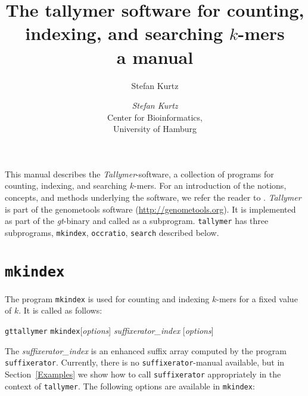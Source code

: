 \documentclass[12pt]{article}
\title{The tallymer software for counting, indexing, and searching $k$-mers\\
a manual}
\author{Stefan Kurtz}
\author{\begin{tabular}{c}
         \emph{Stefan Kurtz}\\
         Center for Bioinformatics,\\
         University of Hamburg
        \end{tabular}}
\newcommand{\Programname}[1]{\texttt{\small #1}}
\newcommand{\Tallymer}[0]{\Programname{tallymer}\xspace}
\newcommand{\TYmkindex}[0]{\Programname{mkindex}\xspace}
\newcommand{\TYsearch}[0]{\Programname{search}\xspace}
\newcommand{\TYoccratio}[0]{\Programname{occratio}\xspace}
\newcommand{\SFX}[0]{\Programname{suffixerator}\xspace}
\newcommand{\GT}[0]{\Programname{gt}\xspace}
\newcommand{\Typrogintro}[1]{
\par
\noindent\GT \Programname{tallymer} #1\xspace [\emph{options}] \Showoption{esa} \emph{suffixerator\_index} [\emph{options}]
\par
The \emph{suffixerator\_index} is an enhanced suffix array computed by the
program \SFX. Currently, there is no \SFX-manual available, but in 
Section~\ref{Examples} we show how to call \SFX appropriately in  the context of
\Tallymer. The following options are available in #1:}
\begin{document}
\maketitle
This manual describes the \textit{Tallymer}-software, a collection of programs
for counting, indexing, and searching $k$-mers. For an introduction of
the notions, concepts, and methods underlying the software, we refer
the reader to \cite{KUR:NER:STE:WAR:2008}. \textit{Tallymer} is part of
the genometools software (\url{http://genometools.org}). It is implemented
as part of the \textit{gt}-binary and called as a subprogram. \Tallymer
has three subprograms, \TYmkindex, \TYoccratio, \TYsearch described below.

\section{\TYmkindex}
The program \TYmkindex is used for counting and indexing \(k\)-mers for
a fixed value of \(k\). It is called as follows:
\par
\Typrogintro{\TYmkindex}
\end{document}
